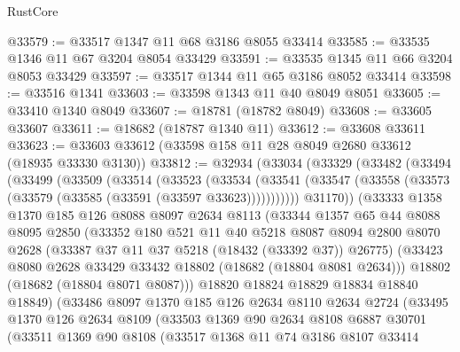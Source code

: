 \begin{lexlean}{RustCore}
\begin{coremodule}
@33579 := @33517 @1347 @11 @68 @3186 @8055 @33414
@33585 := @33535 @1346 @11 @67 @3204 @8054 @33429
@33591 := @33535 @1345 @11 @66 @3204 @8053 @33429
@33597 := @33517 @1344 @11 @65 @3186 @8052 @33414
@33598 := @33516 @1341
@33603 := @33598 @1343 @11 @40 @8049 @8051
@33605 := @33410 @1340 @8049
@33607 := @18781 (@18782 @8049)
@33608 := @33605 @33607
@33611 := @18682 (@18787 @1340 @11)
@33612 := @33608 @33611
@33623 := @33603 @33612 (@33598 @158 @11 @28 @8049 @2680 @33612 (@18935 @33330 @3130))
@33812 := @32934
    (@33034
      (@33329
        (@33482
          (@33494
            (@33499
              (@33509
                (@33514
                  (@33523
                    (@33534
                      (@33541
                        (@33547 (@33558 (@33573 (@33579 (@33585 (@33591 (@33597 @33623)))))))))))
                @31170))
            (@33333
              @1358
              @1370
              @185
              @126
              @8088
              @8097
              @2634
              @8113
              (@33344
                @1357
                @65
                @44
                @8088
                @8095
                @2850
                (@33352
                  @180
                  @521
                  @11
                  @40
                  @5218
                  @8087
                  @8094
                  @2800
                  @8070
                  @2628
                  (@33387 @37 @11 @37 @5218 (@18432 (@33392 @37)) @26775)
                  (@33423 @8080 @2628 @33429 @33432 @18802 (@18682 (@18804 @8081 @2634)))
                  @18802
                  (@18682 (@18804 @8071 @8087)))
                @18820
                @18824
                @18829
                @18834
                @18840
                @18849)
              (@33486
                @8097
                @1370
                @185
                @126
                @2634
                @8110
                @2634
                @2724
                (@33495
                  @1370
                  @126
                  @2634
                  @8109
                  (@33503
                    @1369
                    @90
                    @2634
                    @8108
                    @6887
                    @30701
                    (@33511
                      @1369
                      @90
                      @8108
                      (@33517
                        @1368
                        @11
                        @74
                        @3186
                        @8107
                        @33414

\end{coremodule}
\end{lexlean}
